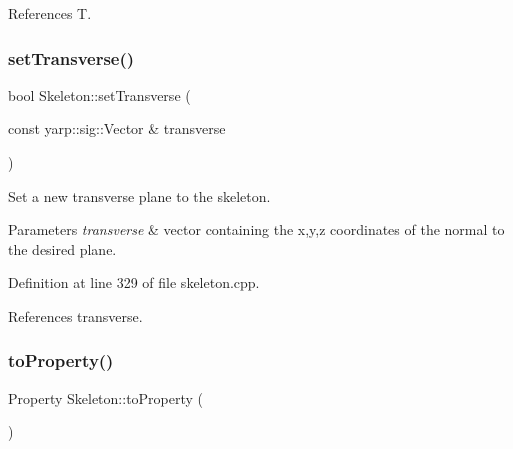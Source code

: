 References T.

\mbox{\label{classassistive__rehab_1_1Skeleton_a1aeba05a17363afc08c30397d17375df}} 
\subsubsection{\texorpdfstring{setTransverse()}{setTransverse()}}
{\footnotesize\ttfamily bool Skeleton\+::set\+Transverse (\begin{DoxyParamCaption}\item[{const yarp\+::sig\+::\+Vector \&}]{transverse }\end{DoxyParamCaption})}



Set a new transverse plane to the skeleton. 


\begin{DoxyParams}{Parameters}
{\em transverse} & vector containing the x,y,z coordinates of the normal to the desired plane. \\
\hline
\end{DoxyParams}


Definition at line 329 of file skeleton.\+cpp.


\begin{DoxyCode}{0}

\end{DoxyCode}


References transverse.

\mbox{\label{classassistive__rehab_1_1Skeleton_ad58ea53a165abc3f39a3c46594f0560f}} 
\subsubsection{\texorpdfstring{toProperty()}{toProperty()}}
{\footnotesize\ttfamily Property Skeleton\+::to\+Property (\begin{DoxyParamCaption}{ }\end{DoxyParamCaption})\hspace{0.3cm}{\ttfamily [virtual]}}



